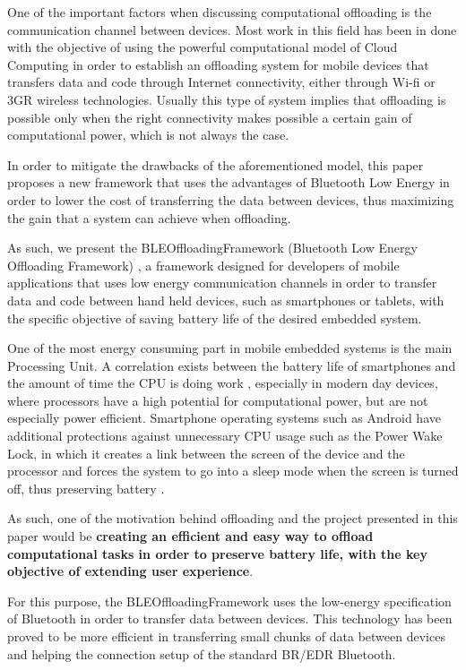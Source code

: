 One of the important factors when discussing computational offloading is the communication channel between devices. Most work in this field has been in done with the objective of using the powerful computational model of Cloud Computing\cite{kumar2010cloud} in order to establish an offloading system for mobile devices that transfers data and code through Internet connectivity, either through Wi-fi or 3GR wireless technologies. Usually this type of system implies that offloading is possible only when the right connectivity makes possible a certain gain of computational power, which is not always the case.

In order to mitigate the drawbacks of the aforementioned model, this paper proposes a new framework that uses the advantages of Bluetooth Low Energy in order to lower the cost of transferring the data between devices, thus maximizing the gain that a system can achieve when offloading.

As such, we present the BLEOffloadingFramework (Bluetooth Low Energy Offloading Framework) , a framework designed for developers of mobile applications that uses low energy communication channels in order to transfer data and code between hand held devices, such as smartphones or tablets, with the specific objective of saving battery life of the desired embedded system.

One of the most energy consuming part in mobile embedded systems is the main Processing Unit. A correlation exists between the battery life of smartphones and the amount of time the CPU is doing work \cite{ferreira2011understanding}, especially in modern day devices, where processors have a high potential for computational power, but are not especially power efficient. Smartphone operating systems such as Android have additional protections against unnecessary CPU usage such as the Power Wake Lock, in which it creates a link between the screen of the device and the processor and forces the system to go into a sleep mode when the screen is turned off, thus preserving battery \cite{datta2012android}.

As such, one of the motivation behind offloading and the project presented in this paper would be \textbf{creating an efficient and easy way to offload computational tasks in order to preserve battery life, with the key objective of extending user experience}.

For this purpose, the BLEOffloadingFramework uses the low-energy specification of Bluetooth in order to transfer data between devices. This technology has been proved to be more efficient in transferring small chunks of data between devices \cite{mackensen2012performance} and helping the connection setup of the standard BR/EDR Bluetooth.

